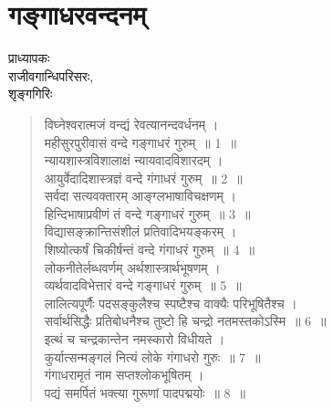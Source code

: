 {\fontsize{15}{17}\selectfont
\presetvalues
\chapter{गङ्गाधरवन्दनम्}

\begin{center}
\smallskip

प्राध्यापकः\\
राजीवगान्धिपरिसरः,\\
शृङ्गगिरिः
\addrule
\end{center}

\begin{verse}
विघ्नेश्वरात्मजं वन्द्यं  रेवत्यानन्दवर्धनम् ।\\
महीसुरपुरीवासं वन्दे गङ्गाधरं गुरुम्~॥ 1~॥\\
न्यायशास्त्रविशालाक्षं न्यायवादविशारदम् ।\\
आयुर्वेदादिशास्त्रज्ञं वन्दे गंगाधरं गुरुम्~॥ 2~॥\\
सर्वदा सत्यवक्तारम् आङ्ग्लभाषाविचक्षणम् ।\\
हिन्दिभाषाप्रवीणं तं वन्दे गङ्गाधरं गुरुम्~॥ 3~॥\\
विद्यासङ्क्रान्तिसंशीलं प्रतिवादिभयङ्करम् ।\\
शिष्योत्कर्षं चिकीर्षन्तं वन्दे गंगाधरं गुरुम्~॥ 4~॥\\
लोकनीतेर्लब्धवर्णम् अर्थशास्त्रार्थभूषणम् ।\\
व्यर्थवादविभेत्तारं वन्दे गङ्गाधरं गुरुम्~॥ 5~॥\\
लालित्यपूर्णैः पदसङ्कुलैश्च स्पष्टैश्च वाक्यैः परिभूषितैश्च ।\\
सर्वार्थसिद्धैः प्रतिबोधनैश्च तुष्टो हि चन्द्रो नतमस्तकोऽस्मि~॥ 6~॥\\
इत्थं च चन्द्रकान्तेन नमस्कारो विधीयते ।\\
कुर्यात्सन्मङ्गलं नित्यं लोके गंगाधरो गुरुः~॥ 7~॥\\
गंगाधरामृतं नाम सप्तश्लोकभूषितम्  ।\\
पद्यं समर्पितं भक्त्या गुरूणां पादपद्मयोः~॥ 8~॥
\end{verse}

\articleend
}
